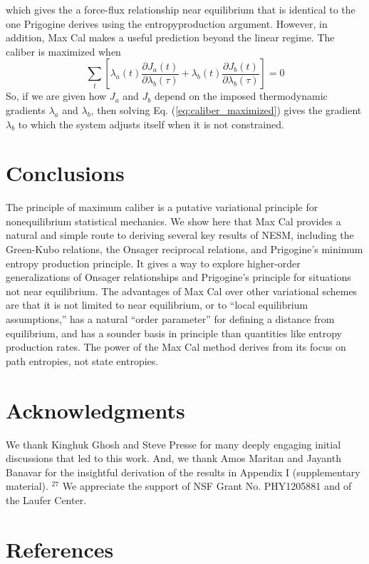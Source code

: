 \documentclass[aps,pra,twocolumn]{revtex4-1}
\begin{document}
which gives the a force-flux relationship near equilibrium that is identical to the one Prigogine derives using the entropyproduction argument. However, in addition, Max Cal makes a useful prediction beyond the linear regime. The caliber is maximized when
\begin{equation}
\sum_t\left[\lambda_a(t) \frac{\partial J_a(t)}{\partial \lambda_b(\tau)}+\lambda_b(t) \frac{\partial J_b(t)}{\partial \lambda_b(\tau)}\right]=0 \label{eq:caliber_maximized}
\end{equation}
So, if we are given how $J_a$ and $J_b$ depend on the imposed thermodynamic gradients $\lambda_a$ and $\lambda_b$, then solving Eq. (\ref{eq:caliber_maximized}) gives the gradient $\lambda_b$ to which the system adjusts itself when it is not constrained.

\section{Conclusions}

The principle of maximum caliber is a putative variational principle for nonequilibrium statistical mechanics. We show here that Max Cal provides a natural and simple route to deriving several key results of NESM, including the Green-Kubo relations, the Onsager reciprocal relations, and Prigogine's minimum entropy production principle. It gives a way to explore higher-order generalizations of Onsager relationships and Prigogine's principle for situations not near equilibrium. The advantages of Max Cal over other variational schemes are that it is not limited to near equilibrium, or to ``local equilibrium assumptions,'' has a natural ``order parameter'' for defining a distance from equilibrium, and has a sounder basis in principle than quantities like entropy production rates. The power of the Max Cal method derives from its focus on path entropies, not state entropies.

\section*{Acknowledgments}

We thank Kinghuk Ghosh and Steve Presse for many deeply engaging initial discussions that led to this work. And, we thank Amos Maritan and Jayanth Banavar for the insightful derivation of the results in Appendix I (supplementary material). ${ }^{27}$ We appreciate the support of NSF Grant No. PHY1205881 and of the Laufer Center.

\section*{References}
\end{document}
